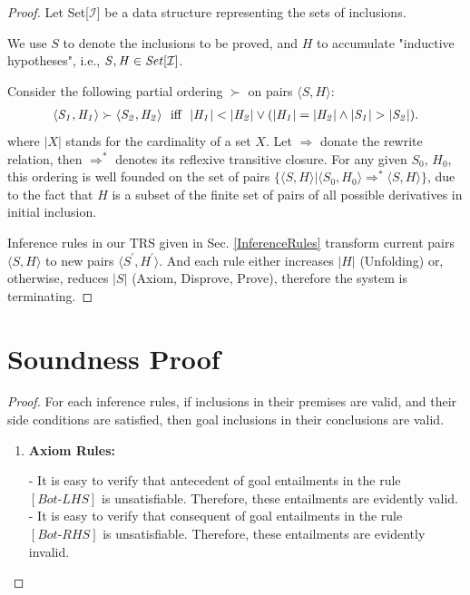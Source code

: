 \documentclass[acmsmall,10pt,review]{acmart}
\newcommand{\code}[1]{{\tt{\ensuremath{\m{#1}}}}}
\newcommand{\codeme}[1]{{\tt{\ensuremath{#1}}}}
\newcommand{\m}{\mathit}
\newcommand{\inclusion}{\code{\mathcal{I}}}
\newcommand\secref[1]{Sec. \textcolor{black}{\ref{#1}}}
\begin{document}
{{{\begin{proof}\label{proof:termination} 
Let Set[\inclusion] be a data structure representing the sets of inclusions. 

We use \code{S} to denote the inclusions to be proved, and \code{H} to accumulate  "inductive hypotheses", i.e., \code{S,  H \in Set[\inclusion]}.

Consider the following partial ordering \code{\succ} on pairs \code{\langle S, H \rangle}:
\begin{gather*}
\code{\langle S_1, H_1 \rangle \succ \langle S_2, H_2 \rangle}\ \ \text{iff}\ \ \code{|H_1| < |H_2| \vee 
(|H_1| = |H_2| \wedge |S_1| > |S_2|)}. 
\end{gather*}
where \code{|X|} stands for the cardinality of a set \code{X}.  Let \code{\Rightarrow} donate the rewrite relation, then \code{\Rightarrow^*} denotes its reflexive transitive closure. For any given \code{S_0}, \code{H_0}, this ordering is well founded on the set of pairs \code{\{\langle S, H \rangle | \langle S_0, H_0 \rangle \Rightarrow^* \langle S, H \rangle \}}, due to the fact that \code{H} is a subset of the finite set of pairs of all possible derivatives in initial inclusion.


Inference rules in our TRS given in \secref{InferenceRules} transform current pairs \code{\langle S, H \rangle} to new pairs \code{\langle S^\prime, H^\prime \rangle}. 
And each rule either increases \code{|H|} (Unfolding) or, otherwise, reduces \code{|S|} (Axiom, Disprove, Prove), therefore the system is terminating.




 \end{proof}


\section{Soundness Proof} 
 \label{proof:SoundnessProof}
 

 

\begin{proof}
  For each inference rules, if inclusions in their premises are valid, and their side conditions are satisfied, then goal inclusions in their conclusions are valid.
  
  \begin{enumerate}
  \item \textbf{Axiom Rules:} 
  
  - It is easy to verify that antecedent of goal entailments in the rule \codeme{[Bot\text{-}LHS]} is unsatisfiable. Therefore, these entailments are evidently valid.\\
  - It is easy to verify that consequent of goal entailments in the rule \codeme{[Bot\text{-}RHS]} is unsatisfiable. Therefore, these entailments are evidently invalid.\\
  

\end{enumerate}
\end{proof}}}}
\end{document}
